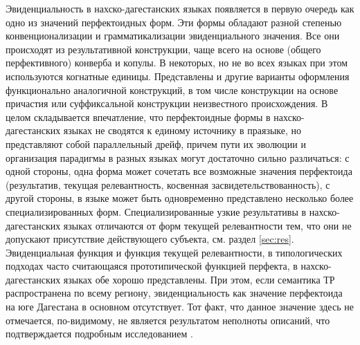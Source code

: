 Эвиденциальность в нахско-дагестанских языках появляется в первую очередь как одно из значений перфектоидных форм. Эти формы обладают разной степенью конвенционализации и грамматикализации эвиденциального значения. Все они происходят из результативной конструкции, чаще всего на основе (общего перфективного) конверба и копулы. В некоторых, но не во всех языках при этом используются когнатные единицы. Представлены и другие варианты оформления функционально аналогичной конструкций, в том числе конструкции на основе причастия или суффиксальной конструкции неизвестного происхождения. В целом складывается впечатление, что перфектоидные формы в нахско-дагестанских языках не сводятся к единому источнику в праязыке, но представляют собой параллельный дрейф, причем пути их эволюции и организация парадигмы в разных языках могут достаточно сильно различаться: с одной стороны, одна форма может сочетать все возможные значения перфектоида (результатив, текущая релевантность, косвенная засвидетельствованность), с другой стороны, в языке может быть одновременно представлено несколько более специализированных форм. Специализированные узкие результативы в нахско-дагестанских языках отличаются от форм текущей релевантности тем, что они не допускают присутствие действующего субъекта, см. раздел \ref{sec:res}. Эвиденциальная функция и функция текущей релевантности, в типологических подходах часто считающаяся прототипической функцией перфекта, в нахско-дагестанских языках обе хорошо представлены. При этом, если семантика ТР распространена по всему региону, эвиденциальность как значение перфектоида на юге Дагестана в основном отсутствует. Тот факт, что данное значение здесь не отмечается, по-видимому, не является результатом неполноты описаний, что подтверждается подробным исследованием \citep{maisaklezgpf}.
